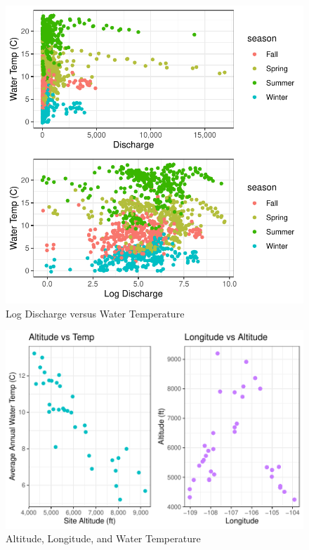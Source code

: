 \documentclass[
]{article}
\begin{document}
\begin{figure}
\centering
\includegraphics{D2P-Report_files/figure-latex/fig4-1.pdf}
\caption{\label{fig:figs4}Log Discharge versus Water Temperature}
\end{figure}

\begin{figure}
\centering
\includegraphics{D2P-Report_files/figure-latex/fig5-1.pdf}
\caption{\label{fig:figs5}Altitude, Longitude, and Water Temperature}
\end{figure}
\end{document}
